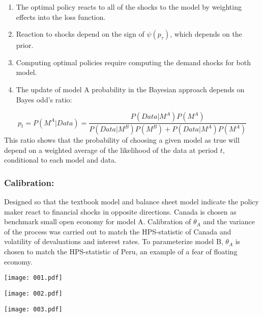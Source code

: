 \documentclass{beamer}
\begin{document}
\begin{frame}
\begin{enumerate} 
\item The optimal policy reacts to all of the shocks to the model by weighting
effects into the loss function.
\item Reaction to shocks depend on the sign of $\psi(p_\tau)$, which depends on
the prior.
\item Computing optimal policies require computing the demand shocks for both
model.
\item The update of model A probability in the Bayesian approach depends on
Bayes odd's ratio:
\end{enumerate}
\begin{equation}
p_t = P (M^A | Data) = \frac{P(Data|M^A) P(M^A)}{P(Data|M^B) P(M^B) + P(Data|M^A) P(M^A)}
\end{equation}
This ratio shows that the probability of choosing a given model as true will
depend on a weighted average of the likelihood of the data at period $t$, conditional to each model and data. 
\end{frame}

\begin{frame}
\frametitle{Calibration: } Designed so that the textbook model and balance sheet
model indicate the policy maker react to financial shocks in opposite
directions.
\newline
\newline
Canada is chosen as benchmark small open economy for model A. Calibration of
$\theta_A$ and the variance of the process was carried out to match the
HPS-statistic of Canada and volatility of devaluations and interest rates. To
parameterize model B, $\theta_A$  is chosen to match the HPS-statistic of Peru,
an example of a fear of floating economy.
\end{frame}

\begin{frame}
\texttt{[image: 001.pdf]}
\end{frame}

\begin{frame}
\texttt{[image: 002.pdf]}
\end{frame}

\begin{frame}
\texttt{[image: 003.pdf]}
\end{frame}
\end{document}
